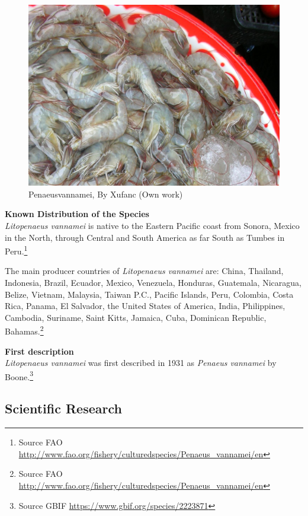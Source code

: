 \documentclass[openany]{book}
\let\rmarkdownfootnote\footnote%
\def\footnote{\protect\rmarkdownfootnote}
\theoremstyle{definition}
\theoremstyle{definition}
\theoremstyle{definition}
\theoremstyle{remark}
\begin{document}
\begin{figure}

{\centering \includegraphics[width=19.69in]{images_species/Litopenaeus_vannamei55} 

}

\caption{Penaeusvannamei, By Xufanc (Own work)}\label{fig:unnamed-chunk-4}
\end{figure}

\textbf{Known Distribution of the Species}\\
\emph{Litopenaeus vannamei} is native to the Eastern Pacific coast from
Sonora, Mexico in the North, through Central and South America as far
South as Tumbes in Peru.\footnote{Source FAO
  \url{http://www.fao.org/fishery/culturedspecies/Penaeus_vannamei/en}}

The main producer countries of \emph{Litopenaeus vannamei} are: China,
Thailand, Indonesia, Brazil, Ecuador, Mexico, Venezuela, Honduras,
Guatemala, Nicaragua, Belize, Vietnam, Malaysia, Taiwan P.C., Pacific
Islands, Peru, Colombia, Costa Rica, Panama, El Salvador, the United
States of America, India, Philippines, Cambodia, Suriname, Saint Kitts,
Jamaica, Cuba, Dominican Republic, Bahamas.\footnote{Source FAO
  \url{http://www.fao.org/fishery/culturedspecies/Penaeus_vannamei/en}}

\textbf{First description}\\
\emph{Litopenaeus vannamei} was first described in 1931 as \emph{Penaeus
vannamei} by Boone.\footnote{Source GBIF
  \url{https://www.gbif.org/species/2223871}}

\hypertarget{scientific-research-2}{%
\subsection{Scientific Research}\label{scientific-research-2}}
\end{document}

